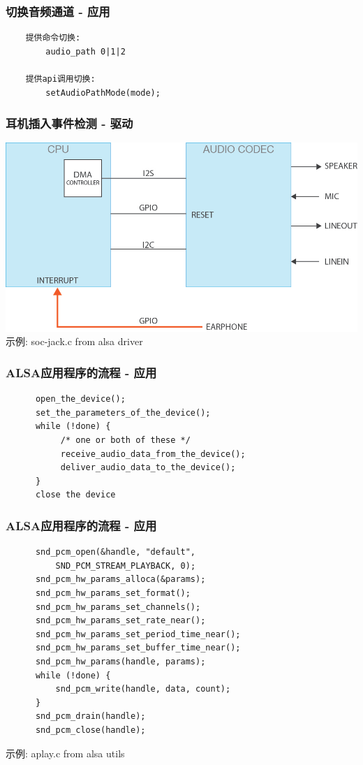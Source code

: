 \documentclass[CJK]{beamer}
\begin{document}
\begin{frame}[fragile]
    \frametitle{切换音频通道 - 应用}
    \begin{verbatim}
    提供命令切换:
        audio_path 0|1|2

    提供api调用切换:
        setAudioPathMode(mode);
    \end{verbatim}
\end{frame}

\begin{frame}
    \frametitle{耳机插入事件检测 - 驱动}
    \includegraphics[height=140bp]{"jack_detection.png"}
    示例: soc-jack.c from alsa driver
\end{frame}

\begin{frame}[fragile]
    \frametitle{ALSA应用程序的流程 - 应用}
    \begin{verbatim}
      open_the_device();
      set_the_parameters_of_the_device();
      while (!done) {
           /* one or both of these */
           receive_audio_data_from_the_device();
           deliver_audio_data_to_the_device();
      }
      close the device
    \end{verbatim}
\end{frame}

\begin{frame}[fragile]
    \frametitle{ALSA应用程序的流程 - 应用}
    \begin{verbatim}
      snd_pcm_open(&handle, "default", 
          SND_PCM_STREAM_PLAYBACK, 0);
      snd_pcm_hw_params_alloca(&params);
      snd_pcm_hw_params_set_format();
      snd_pcm_hw_params_set_channels();
      snd_pcm_hw_params_set_rate_near();
      snd_pcm_hw_params_set_period_time_near();
      snd_pcm_hw_params_set_buffer_time_near();
      snd_pcm_hw_params(handle, params);
      while (!done) {
          snd_pcm_write(handle, data, count);
      }
      snd_pcm_drain(handle);
      snd_pcm_close(handle);
    \end{verbatim}
    示例: aplay.c from alsa utils
\end{frame}
\end{document}
